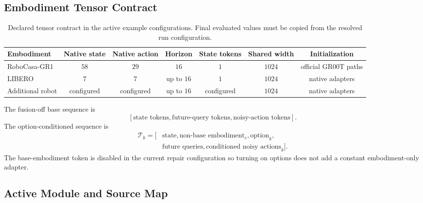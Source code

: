 \subsection{Embodiment Tensor Contract}

\begin{table}[h]
\centering
\scriptsize
\setlength{\tabcolsep}{4pt}
\begin{tabular}{lcccccc}
\toprule
Embodiment & Native state & Native action & Horizon & State tokens & Shared width & Initialization \\
\midrule
RoboCasa-GR1 & \(58\) & \(29\) & \(16\) & \(1\) & \(1024\) & official GR00T paths \\
LIBERO & \(7\) & \(7\) & up to \(16\) & \(1\) & \(1024\) & native adapters \\
Additional robot & configured & configured & up to \(16\) & configured & \(1024\) & native adapters \\
\bottomrule
\end{tabular}
\caption{Declared tensor contract in the active example configurations.  Final
evaluated values must be copied from the resolved run configuration.}
\label{tab:tensor-contract}
\end{table}

The fusion-off base sequence is
\[
[\text{state tokens},\text{future-query tokens},\text{noisy-action tokens}].
\]
The option-conditioned sequence is
\[
\begin{aligned}
\mathcal{T}_k=[&\text{state},\text{non-base embodiment}_e,\text{option}_k,\\
               &\text{future queries},\text{conditioned noisy actions}_k].
\end{aligned}
\]
The base-embodiment token is disabled in the current repair configuration so
turning on options does not add a constant embodiment-only adapter.

\subsection{Active Module and Source Map}

